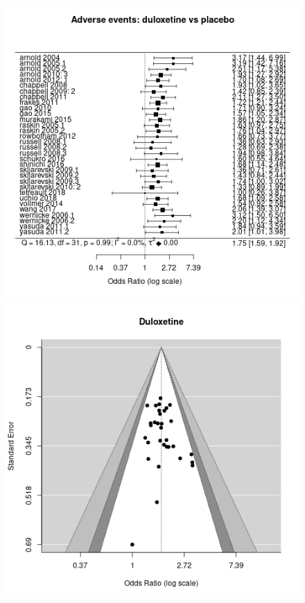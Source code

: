 \documentclass{report}\usepackage[]{graphicx}\usepackage[]{color}
\newenvironment{knitrout}{}{} %
\begin{document}
\begin{figure}
\begin{knitrout}
\color{fgcolor}
\includegraphics[width=0.5\linewidth,height=0.35\textheight]{img/adverse-duloxetine-placebo-forest} 
\includegraphics[width=0.5\linewidth,height=0.35\textheight]{img/adverse-duloxetine-placebo-funnel} 
\end{knitrout}

\caption[Adverse: duloxetine vs pregabalin]{}
\label{fig:adverse-dulox-plac}
\end{figure}
\end{document}
